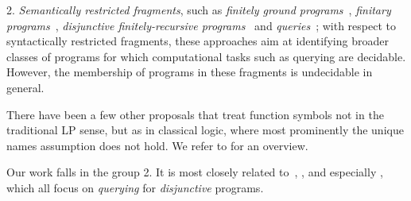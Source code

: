 \documentclass{tlp}
\begin{document}
2. {\em Semantically restricted fragments}, such as
    {\em finitely ground programs}~\cite{cali-etal-2008-iclp},
    {\em finitary programs}~\cite{bona-02-iclp,bona-04},
    {\em disjunctive finitely-recursive
    programs}~\cite{base-etal-2009-tplp} and {\em queries}~\cite{cali-etal-2009-lpnmr};
    with respect to syntactically restricted fragments, these 
    approaches aim at identifying broader classes of
    programs for which computational tasks such as
    querying are decidable. However, the membership of programs in these fragments is undecidable in general.


There have been a few other proposals that treat function symbols not
in the traditional LP sense, but as in classical
logic, where most prominently the unique names assumption does not
hold. We refer to \cite{caba-2008-iclp} for an overview.

Our work falls in the group 2. It is most closely related
to~\cite{bona-02-iclp},
\cite{base-etal-2009-tplp}, and especially \cite{cali-etal-2009-lpnmr},
which all focus on {\em querying} for {\em disjunctive} programs.
\end{document}
